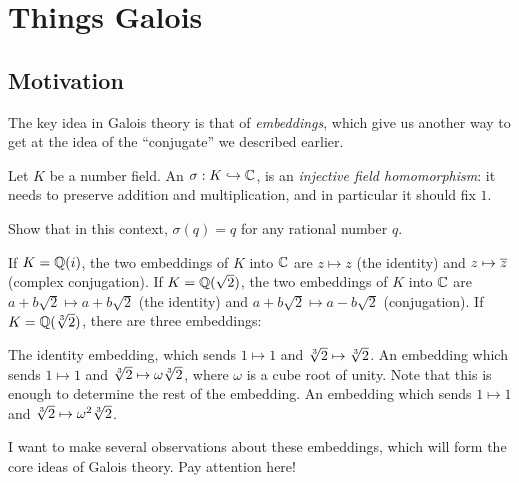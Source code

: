 \chapter{Things Galois}

\section{Motivation}
The key idea in Galois theory is that of \emph{embeddings},
which give us another way to get at the idea of the ``conjugate'' we described earlier.

Let $K$ be a number field.
An  $\sigma : K \hookrightarrow \mathbb C$, is an \emph{injective field homomorphism}:
it needs to preserve addition and multiplication,
and in particular it should fix $1$.
\begin{ques}
	Show that in this context, $\sigma(q) = q$ for any rational number $q$.
\end{ques}

\begin{example}
	\listhack
	\begin{enumerate}[(a)]
		\ii If $K = \mathbb Q(i)$, the two embeddings of $K$ into $\mathbb C$ are
		$z \mapsto z$ (the identity) and $z \mapsto \overline z$ (complex conjugation).
		\ii If $K = \mathbb Q(\sqrt 2)$, the two embeddings of $K$ into $\mathbb C$ are
		$a+b\sqrt 2 \mapsto a+b\sqrt 2$ (the identity) and $a+b\sqrt 2 \mapsto a-b\sqrt 2$ (conjugation).
		\ii If $K = \mathbb Q(\sqrt[3]{2})$, there are three embeddings:
		\begin{itemize}
			\ii The identity embedding, which sends $1 \mapsto 1$ and $\sqrt[3]{2} \mapsto \sqrt[3]{2}$.
			\ii An embedding which sends $1 \mapsto 1$ and $\sqrt[3]{2} \mapsto \omega \sqrt[3]{2}$,
			where $\omega$ is a cube root of unity.
			Note that this is enough to determine the rest of the embedding.
			\ii An embedding which sends $1 \mapsto 1$ and $\sqrt[3]{2} \mapsto \omega^2 \sqrt[3]{2}$.
		\end{itemize}
	\end{enumerate}
\end{example}

I want to make several observations about these embeddings,
which will form the core ideas of Galois theory.
Pay attention here!

